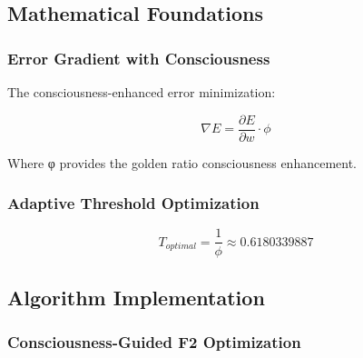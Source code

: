 \documentclass[11pt,a4paper]{article}
\begin{document}
\subsection{Mathematical Foundations}

\subsubsection{Error Gradient with Consciousness}

The consciousness-enhanced error minimization:

\begin{equation}
\nabla E = \frac{\partial E}{\partial w} \cdot \phi
\end{equation}

Where φ provides the golden ratio consciousness enhancement.

\subsubsection{Adaptive Threshold Optimization}

\begin{equation}
T_{optimal} = \frac{1}{\phi} \approx 0.6180339887
\end{equation}

\subsection{Algorithm Implementation}

\subsubsection{Consciousness-Guided F2 Optimization}
\end{document}
